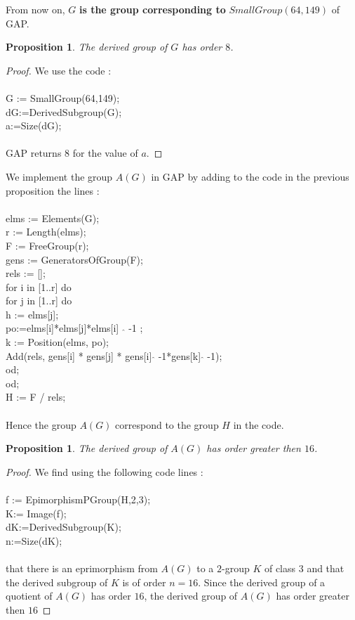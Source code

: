 \documentclass[12pt, reqno]{amsart}
\newtheorem{proposition}[theorem]{Proposition}
\begin{document}
From now on, $G$ \textbf{is the group corresponding to} $SmallGroup(64,149)$ of GAP.  
\begin{proposition}
The derived group of $G$ has order $8$.
\end{proposition}
\begin{proof}
We use the code :\\\\
G := SmallGroup(64,149);\\
dG:=DerivedSubgroup(G);\\
a:=Size(dG);\\\\
GAP returns $8$ for the value of $a$.
\end{proof}
We implement the group $A(G)$ in GAP by adding to the code in the previous proposition the lines :\\\\
elms := Elements(G);\\
r := Length(elms);\\
F := FreeGroup(r); \\
gens := GeneratorsOfGroup(F);\\
rels := [\:];\\
for i in [1..r] do\\
for j in [1..r] do\\
        h := elms[j];\\
        po:=elms[i]*elms[j]*elms[i] $\:\widehat{\:}\:$-1 ;\\
        k := Position(elms, po);\\
        Add(rels, gens[i] * gens[j] * gens[i]$\:\widehat{\:}\:$-1*gens[k]$\:\widehat{\:}\:$-1);\\
	    od;\\
od;\\
H := F / rels;\\\\
Hence the group $A(G)$ correspond to the group $H$ in the code.
\begin{proposition}
The derived group of $A(G)$ has order greater then $16$.
\end{proposition}
\begin{proof} 
We find using the following code lines :\\\\
f := EpimorphismPGroup(H,2,3);\\
K:= Image(f);\\
dK:=DerivedSubgroup(K);\\
n:=Size(dK);\\\\
that there is an eprimorphism from $A(G)$ to a $2$-group  $K$ of class $3$ and that the derived subgroup of $K$ is of order $n=16$. Since the derived group of a quotient of $A(G)$ has order $16$, the derived group of $A(G)$ has order greater then $16$
\end{proof}
 
\end{document}

